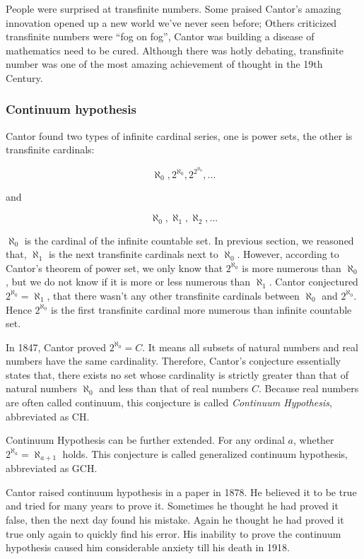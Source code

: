 \documentclass{article}
\begin{document}
People were surprised at transfinite numbers. Some praised Cantor's amazing innovation opened up a new world we've never seen before; Others criticized transfinite numbers were ``fog on fog'', Cantor was building a disease of mathematics need to be cured. Although there was hotly debating, transfinite number was one of the most amazing achievement of thought in the 19th Century.

\subsubsection{Continuum hypothesis}
  
Cantor found two types of infinite cardinal series, one is power sets, the other is transfinite cardinals:

\[
\aleph_0, 2^{\aleph_0}, 2^{2^{\aleph_0}}, ...
\]

and

\[
\aleph_0, \aleph_1, \aleph_2, ...
\]

$\aleph_0$ is the cardinal of the infinite countable set. In previous section, we reasoned that, $\aleph_1$ is the next transfinite cardinals next to $\aleph_0$. However, according to Cantor's theorem of power set, we only know that $2^{\aleph_0}$ is more numerous than $\aleph_0$, but we do not know if it is more or less numerous than $\aleph_1$. Cantor conjectured $2^{\aleph_0} = \aleph_1$, that there wasn't any other transfinite cardinals between $\aleph_0$ and $2^{\aleph_0}$. Hence $2^{\aleph_0}$ is the first transfinite cardinal more numerous than infinite countable set.

In 1847, Cantor proved $2^{\aleph_0} = C$. It means all subsets of natural numbers and real numbers have the same cardinality. Therefore, Cantor's conjecture essentially states that, there exists no set whose cardinality is strictly greater than that of natural numbers $\aleph_0$ and less than that of real numbers $C$. Because real numbers are often called continuum, this conjecture is called {\em Continuum Hypothesis}, abbreviated as CH.

Continuum Hypothesis can be further extended. For any ordinal $a$, whether $2^{\aleph_a} = \aleph_{a+1}$ holds. This conjecture is called generalized continuum hypothesis, abbreviated as GCH.

Cantor raised continuum hypothesis in a paper in 1878. He believed it to be true and tried for many years to prove it. Sometimes he thought he had proved it false, then the next day found his mistake. Again he thought he had proved it true only again to quickly find his error. His inability to prove the continuum hypothesis caused him considerable anxiety till his death in 1918.
\end{document}
